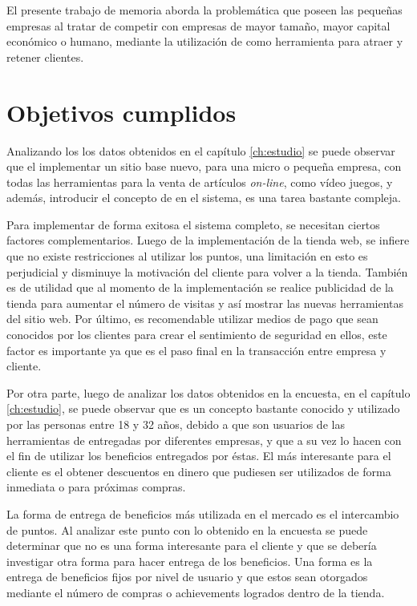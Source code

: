 El presente trabajo de memoria aborda la problemática que poseen las pequeñas
empresas al tratar de competir con empresas de mayor tamaño, mayor capital
económico o humano, mediante la utilización de {\gam} como herramienta para atraer
y retener clientes.

\section{Objetivos cumplidos}



Analizando los los datos obtenidos en el capítulo \ref{ch:estudio} se puede observar que el
implementar un sitio base nuevo, para una micro o pequeña empresa, con todas las
herramientas para la venta de artículos \emph{on-line}, como vídeo juegos, y además,
introducir el concepto de {\gam} en el sistema, es una tarea bastante compleja.

Para implementar de forma exitosa el sistema completo, se necesitan ciertos factores
complementarios. Luego de la implementación de la tienda web, 
se infiere que no existe restricciones al utilizar los puntos, una limitación
en esto es perjudicial y disminuye la motivación del cliente para volver a la tienda. 
También es de utilidad que al momento de la implementación se realice publicidad
de la tienda para aumentar el número de visitas y así mostrar las nuevas herramientas
del sitio web. Por último, es recomendable utilizar medios de pago que sean conocidos
por los clientes para crear el sentimiento de seguridad en ellos, este factor es importante
ya que es el paso final en la transacción entre empresa y cliente. 

Por otra parte, luego de analizar los datos obtenidos en la encuesta, en el capítulo \ref{ch:estudio},
 se puede observar que {\gam} es un concepto bastante conocido y utilizado por las personas 
entre 18 y 32 años, debido a que son usuarios de las herramientas de {\gam} entregadas por
diferentes empresas, y que a su vez lo hacen con el fin de utilizar los beneficios entregados 
por éstas. El más interesante para el cliente es el obtener descuentos en dinero
que pudiesen ser utilizados de forma inmediata o para próximas compras.

La forma de entrega de beneficios más utilizada en el mercado es el intercambio de puntos. 
Al analizar este punto con lo obtenido en la encuesta se puede determinar que no es 
una forma interesante para el cliente y que se debería investigar otra forma para 
hacer entrega de los beneficios. Una forma es la entrega de beneficios fijos por nivel 
de usuario y que estos sean otorgados mediante el número de compras o achievements logrados
dentro de la tienda.

